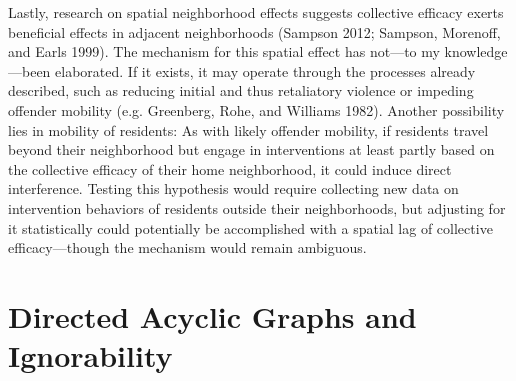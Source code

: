 \documentclass [11pt, proquest] {uwthesis}[2015/03/03]
\begin{document}
Lastly, research on spatial neighborhood effects suggests collective efficacy exerts beneficial effects in adjacent neighborhoods (Sampson 2012; Sampson, Morenoff, and Earls 1999). The mechanism for this spatial effect has not---to my knowledge---been elaborated. If it exists, it may operate through the processes already described, such as reducing initial and thus retaliatory violence or impeding offender mobility (e.g. Greenberg, Rohe, and Williams 1982). Another possibility lies in mobility of residents: As with likely offender mobility, if residents travel beyond their neighborhood but engage in interventions at least partly based on the collective efficacy of their home neighborhood, it could induce direct interference. Testing this hypothesis would require collecting new data on intervention behaviors of residents outside their neighborhoods, but adjusting for it statistically could potentially be accomplished with a spatial lag of collective efficacy---though the mechanism would remain ambiguous.

\hypertarget{directed-acyclic-graphs-and-ignorability}{%
\section{Directed Acyclic Graphs and Ignorability}\label{directed-acyclic-graphs-and-ignorability}}
\end{document}
